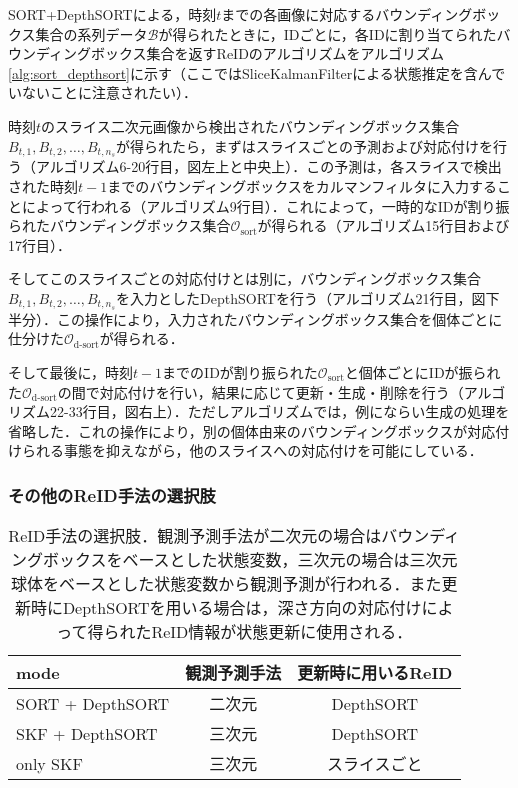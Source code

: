         SORT+DepthSORTによる，時刻$t$までの各画像に対応するバウンディングボックス集合の系列データ$\mathcal{B}$が得られたときに，IDごとに，各IDに割り当てられたバウンディングボックス集合を返すReIDのアルゴリズムをアルゴリズム\ref{alg:sort_depthsort}に示す（ここではSliceKalmanFilterによる状態推定を含んでいないことに注意されたい）．

        時刻$t$のスライス二次元画像から検出されたバウンディングボックス集合$B_{t, 1}, B_{t, 2}, \dots, B_{t, n_s}$が得られたら，まずはスライスごとの予測および対応付けを行う（アルゴリズム6-20行目，図左上と中央上）．この予測は，各スライスで検出された時刻$t-1$までのバウンディングボックスをカルマンフィルタに入力することによって行われる（アルゴリズム9行目）．これによって，一時的なIDが割り振られたバウンディングボックス集合$\mathcal{O}_{\text{sort}}$が得られる（アルゴリズム15行目および17行目）．

        そしてこのスライスごとの対応付けとは別に，バウンディングボックス集合$B_{t, 1}, B_{t, 2}, \dots, B_{t, n_s}$を入力としたDepthSORTを行う（アルゴリズム21行目，図下半分）．この操作により，入力されたバウンディングボックス集合を個体ごとに仕分けた$\mathcal{O}_{\text{d-sort}}$が得られる．

        そして最後に，時刻$t-1$までのIDが割り振られた$\mathcal{O}_{\text{sort}}$と個体ごとにIDが振られた$\mathcal{O}_{\text{d-sort}}$の間で対応付けを行い，結果に応じて更新・生成・削除を行う（アルゴリズム22-33行目，図右上）．ただしアルゴリズムでは，例にならい生成の処理を省略した．これの操作により，別の個体由来のバウンディングボックスが対応付けられる事態を抑えながら，他のスライスへの対応付けを可能にしている．

        \subsubsection{その他のReID手法の選択肢}

        \begin{table}[t]
            \centering
            \caption[ReID手法の選択肢]{ReID手法の選択肢．観測予測手法が二次元の場合はバウンディングボックスをベースとした状態変数，三次元の場合は三次元球体をベースとした状態変数から観測予測が行われる．また更新時にDepthSORTを用いる場合は，深さ方向の対応付けによって得られたReID情報が状態更新に使用される．}
            \label{tab:reidentification_methods}
            \begin{tabular}{l|cc}
                \hline mode &  観測予測手法 & 更新時に用いるReID
                \\ \hline \hline
                SORT + DepthSORT & 二次元 & DepthSORT
                \\ SKF + DepthSORT & 三次元 & DepthSORT
                \\ only SKF & 三次元 & スライスごと 
            \end{tabular}
        \end{table}

